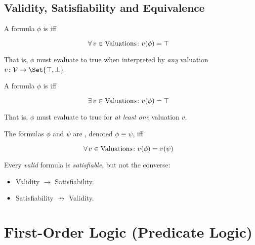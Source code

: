 \subsection{Validity, Satisfiability and Equivalence}

\begin{definition}[Valid]
    A formula $\phi$ is  iff
    
    \begin{equation}
        \operatorname{\forall} v \in \text{Valuations} \colon v(\phi) = \top
    \end{equation}
    
    That is, $\phi$ must evaluate to true when interpreted by \textit{any} 
    valuation $v \colon \mathcal{V} \to \Set{\top, \bot}$.
\end{definition}

\begin{definition}[Satisfiable]
    A formula $\phi$ is  iff
    
    \begin{equation}
        \operatorname{\exists} v \in \text{Valuations} \colon v(\phi) = \top
    \end{equation}
    
    That is, $\phi$ must evaluate to true for \textit{at least one} valuation 
    $v$.
\end{definition}

\begin{definition}[Equivalent]
    The formulas $\phi$ and $\psi$ are , denoted 
    $\phi \equiv \psi$, iff
    
    \begin{equation}
        \operatorname{\forall} v \in \text{Valuations} \colon v(\phi) = v(\psi)
    \end{equation}
\end{definition}

\begin{remark}
    Every \textit{valid} formula is \textit{satisfiable}, but not the converse:
    
    \begin{itemize}
        \item Validity $\to$ Satisfiability.
        \item Satisfiability $\not\to$ Validity.
    \end{itemize}
\end{remark}

\section{First-Order Logic (Predicate Logic)}

